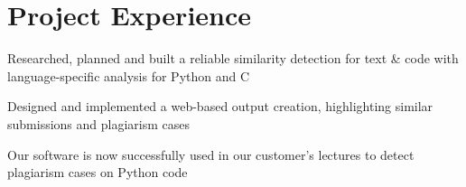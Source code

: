 \documentclass[]{deedy-resume}
\begin{document}
\begin{minipage}[t]{0.66\textwidth}

\section{Project Experience}
\begin{tightemize}
    \item Researched, planned and built a reliable similarity detection for text \& code with language-specific analysis for
    Python and C
    \item Designed and implemented a web-based output creation, highlighting similar submissions and plagiarism cases
    \item Our software is now successfully used in our customer's lectures to detect plagiarism cases on Python code
\end{tightemize}



% 
% 

\end{minipage}
\end{document}
